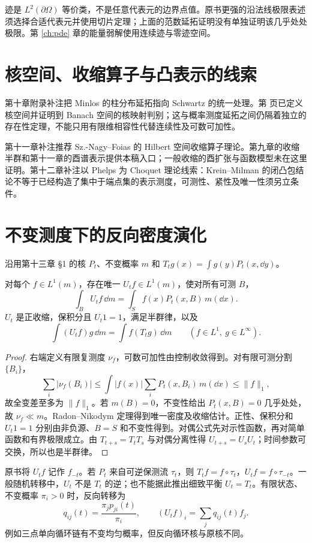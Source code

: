 迹是 $L^2(\partial\Omega)$ 等价类，不是任意代表元的边界点值。原书更强的沿法线极限表述须选择合适代表元并使用切片定理；上面的范数延拓证明没有单独证明该几乎处处极限。第 \ref{ch:pde} 章的能量弱解使用连续迹与零迹空间。

\section*{核空间、收缩算子与凸表示的线索}
第十章附录补注把 Minlos 的柱分布延拓指向 Schwartz 的统一处理。第 \pageref{app:yosida-10} 页已定义核空间并证明到 Banach 空间的核映射判别；这与概率测度延拓之间仍隔着独立的存在性定理，不能只用有限维相容性代替连续性及可数可加性。

第十一章补注推荐 Sz.-Nagy--Foias 的 Hilbert 空间收缩算子理论。第九章的收缩半群和第十一章的酉谱表示提供本稿入口；一般收缩的酉扩张与函数模型未在这里证明。第十二章补注以 Phelps 为 Choquet 理论线索：Krein--Milman 的闭凸包结论不等于已经构造了集中于端点集的表示测度，可测性、紧性及唯一性须另立条件。

\section*{不变测度下的反向密度演化}
\label{sec:supp-markov}
沿用第十三章 §1 的核 $P_t$、不变概率 $m$ 和 $T_tg(x)=\int g(y)P_t(x,\dd y)$。
\begin{proposition}\label{prop:supp-markov-density}
对每个 $f\in L^1(m)$，存在唯一 $U_tf\in L^1(m)$，使对所有可测 $B$，
\[
 \int_B U_tf\,\dd m=\int_S f(x)P_t(x,B)\,m(\dd x).
\]
$U_t$ 是正收缩，保积分且 $U_t1=1$，满足半群律，以及
\[
 \int (U_tf)g\,\dd m=\int f(T_tg)\,\dd m
 \qquad(f\in L^1,\ g\in L^\infty).
\]
\end{proposition}
\begin{proof}
右端定义有限复测度 $\nu_f$，可数可加性由控制收敛得到。对有限可测分割 $\{B_i\}$，
\[
 \sum_i|\nu_f(B_i)|\le\int |f(x)|\sum_iP_t(x,B_i)\,m(\dd x)
 \le\|f\|_1,
\]
故全变差至多为 $\|f\|_1$。若 $m(B)=0$，不变性给出 $P_t(x,B)=0$ 几乎处处，故 $\nu_f\ll m$。Radon--Nikodym 定理得到唯一密度及收缩估计。正性、保积分和 $U_t1=1$ 分别由非负源、$B=S$ 和不变性得到。对偶公式先对示性函数，再对简单函数和有界极限成立。由 $T_{t+s}=T_tT_s$ 与对偶分离性得 $U_{t+s}=U_sU_t$；时间参数可交换，所以也是半群律。
\end{proof}
原书将 $U_tf$ 记作 $f_{-t}$。若 $P_t$ 来自可逆保测流 $\tau_t$，则 $T_tf=f\circ\tau_t$，$U_tf=f\circ\tau_{-t}$。一般随机转移中，$U_t$ 不是 $T_t$ 的逆；也不能据此推出细致平衡 $U_t=T_t$。有限状态、不变概率 $\pi_i>0$ 时，反向转移为
\[
 q_{ij}(t)=\frac{\pi_jp_{ji}(t)}{\pi_i},\qquad
 (U_tf)_i=\sum_jq_{ij}(t)f_j.
\]
例如三点单向循环链有不变均匀概率，但反向循环核与原核不同。

